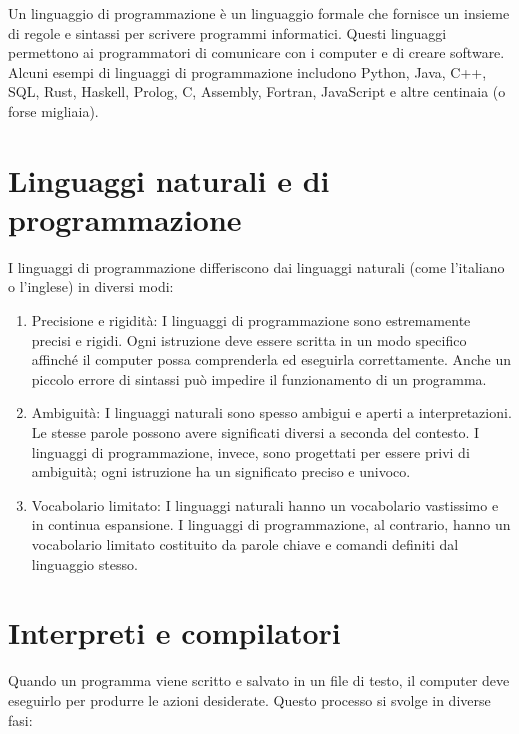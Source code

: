 \documentclass[
  letterpaper,
]{scrbook}
\begin{document}
Un linguaggio di programmazione è un linguaggio formale che fornisce un
insieme di regole e sintassi per scrivere programmi informatici. Questi
linguaggi permettono ai programmatori di comunicare con i computer e di
creare software. Alcuni esempi di linguaggi di programmazione includono
Python, Java, C++, SQL, Rust, Haskell, Prolog, C, Assembly, Fortran,
JavaScript e altre centinaia (o forse migliaia).

\section{Linguaggi naturali e di
programmazione}\label{linguaggi-naturali-e-di-programmazione}

I linguaggi di programmazione differiscono dai linguaggi naturali (come
l'italiano o l'inglese) in diversi modi:

\begin{enumerate}
\def\labelenumi{\arabic{enumi}.}
\item
  Precisione e rigidità: I linguaggi di programmazione sono estremamente
  precisi e rigidi. Ogni istruzione deve essere scritta in un modo
  specifico affinché il computer possa comprenderla ed eseguirla
  correttamente. Anche un piccolo errore di sintassi può impedire il
  funzionamento di un programma.
\item
  Ambiguità: I linguaggi naturali sono spesso ambigui e aperti a
  interpretazioni. Le stesse parole possono avere significati diversi a
  seconda del contesto. I linguaggi di programmazione, invece, sono
  progettati per essere privi di ambiguità; ogni istruzione ha un
  significato preciso e univoco.
\item
  Vocabolario limitato: I linguaggi naturali hanno un vocabolario
  vastissimo e in continua espansione. I linguaggi di programmazione, al
  contrario, hanno un vocabolario limitato costituito da parole chiave e
  comandi definiti dal linguaggio stesso.
\end{enumerate}

\section{Interpreti e compilatori}\label{interpreti-e-compilatori}

Quando un programma viene scritto e salvato in un file di testo, il
computer deve eseguirlo per produrre le azioni desiderate. Questo
processo si svolge in diverse fasi:
\end{document}
